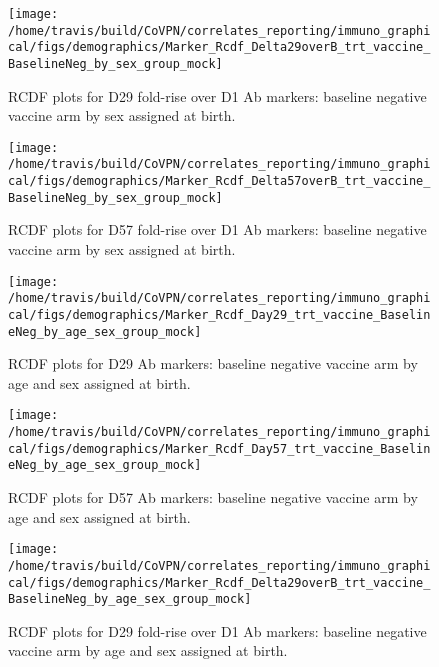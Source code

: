 \documentclass[]{book}
\theoremstyle{definition}
\theoremstyle{definition}
\theoremstyle{definition}
\newcommand{\1}{\mathbbm{1}}
\begin{document}
\begin{figure}[H]

{\centering \texttt{[image: /home/travis/build/CoVPN/correlates\_reporting/immuno\_graphical/figs/demographics/Marker\_Rcdf\_Delta29overB\_trt\_vaccine\_BaselineNeg\_by\_sex\_group\_mock]} 

}

\caption{RCDF plots for D29 fold-rise over D1 Ab markers: baseline negative vaccine arm by sex assigned at birth.}\label{fig:unnamed-chunk-69}
\end{figure}

\begin{figure}[H]

{\centering \texttt{[image: /home/travis/build/CoVPN/correlates\_reporting/immuno\_graphical/figs/demographics/Marker\_Rcdf\_Delta57overB\_trt\_vaccine\_BaselineNeg\_by\_sex\_group\_mock]} 

}

\caption{RCDF plots for D57 fold-rise over D1 Ab markers: baseline negative vaccine arm by sex assigned at birth.}\label{fig:unnamed-chunk-70}
\end{figure}

\begin{figure}[H]

{\centering \texttt{[image: /home/travis/build/CoVPN/correlates\_reporting/immuno\_graphical/figs/demographics/Marker\_Rcdf\_Day29\_trt\_vaccine\_BaselineNeg\_by\_age\_sex\_group\_mock]} 

}

\caption{RCDF plots for D29 Ab markers: baseline negative vaccine arm by age and sex assigned at birth.}\label{fig:unnamed-chunk-71}
\end{figure}

\begin{figure}[H]

{\centering \texttt{[image: /home/travis/build/CoVPN/correlates\_reporting/immuno\_graphical/figs/demographics/Marker\_Rcdf\_Day57\_trt\_vaccine\_BaselineNeg\_by\_age\_sex\_group\_mock]} 

}

\caption{RCDF plots for D57 Ab markers: baseline negative vaccine arm by age and sex assigned at birth.}\label{fig:unnamed-chunk-72}
\end{figure}

\begin{figure}[H]

{\centering \texttt{[image: /home/travis/build/CoVPN/correlates\_reporting/immuno\_graphical/figs/demographics/Marker\_Rcdf\_Delta29overB\_trt\_vaccine\_BaselineNeg\_by\_age\_sex\_group\_mock]} 

}

\caption{RCDF plots for D29 fold-rise over D1 Ab markers: baseline negative vaccine arm by age and sex assigned at birth.}\label{fig:unnamed-chunk-73}
\end{figure}
\end{document}

